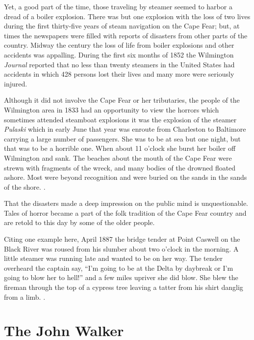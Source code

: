 \documentclass[11pt, a5paper, openright]{book}
\newcommand{\steamer}[1]{\textit{#1}\index{#1,~steamer}}
\begin{document}
Yet, a good part of the time, those traveling by steamer seemed to
harbor a dread of a boiler explosion.  There was but one explosion
with the loss of two lives during the first thirty-five years of steam
navigation on the Cape Fear; but, at times the newspapers were filled
with reports of disasters from other parts of the country.  Midway the
century the loss of life from boiler explosions and other accidents
was appalling.  During the first six months of 1852 the Wilmington
\textit{Journal} reported that no less than twenty steamers in the
United States had accidents in which 428 persons lost their lives and
many more were seriously injured.\par

Although it did not involve the Cape Fear or her tributaries, the
people of the Wilmington area in 1833 had an opportunity to view the
horrors which sometimes attended steamboat explosions it was the
explosion of the steamer \steamer{Pulaski} which in early June that
year was enroute from Charleston to Baltimore carrying a large number
of passengers.  She was to be at sea but one night, but that was to be
a horrible one.  When about 11 o'clock she burst her boiler off
Wilmington and sank.  The beaches about the mouth of the Cape Fear
were strewn with fragments of the wreck, and many bodies of the
drowned floated ashore.  Most were beyond recognition and were buried
on the sands in the sands of the shore.  \citep[3-14-1884]{ws}.\par

That the disasters made a deep impression on the public mind is
unquestionable.  Tales of horror became a part of the folk tradition
of the Cape Fear country and are retold to this day by some of the
older people.\par

Citing one example here, April 1887 the bridge tender at Point Caswell
on the Black River was roused from his slumber about two o'clock in
the morning.  A little steamer was running late and wanted to be on
her way.  The tender overheard the captain say, ``I'm going to be at
the Delta by daybreak or I'm going to blow her to hell!'' and a few
miles upriver she did blow.  She blew the fireman through the top of a
cypress tree leaving a tatter from his shirt danglig from a limb.
\citep{kellya}.\par

\section{The John Walker}
\end{document}
